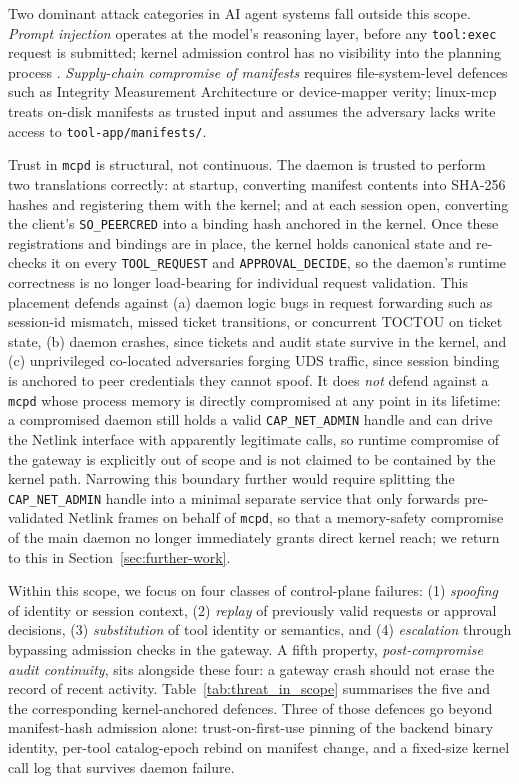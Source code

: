 Two dominant attack categories in AI agent systems fall outside this scope.
\emph{Prompt injection} operates at the model's reasoning layer, before any \texttt{tool:exec} request is submitted; kernel admission control has no visibility into the planning process \cite{greshake2023prompt, liu2023prompt}.
\emph{Supply-chain compromise of manifests} requires file-system-level defences such as Integrity Measurement Architecture or device-mapper verity; linux-mcp treats on-disk manifests as trusted input and assumes the adversary lacks write access to \texttt{tool-app/\allowbreak manifests/}.

Trust in \texttt{mcpd} is structural, not continuous.
The daemon is trusted to perform two translations correctly: at startup, converting manifest contents into SHA-256 hashes and registering them with the kernel; and at each session open, converting the client's \texttt{SO\_\allowbreak PEERCRED} into a binding hash anchored in the kernel.
Once these registrations and bindings are in place, the kernel holds canonical state and re-checks it on every \texttt{TOOL\_\allowbreak REQUEST} and \texttt{APPROVAL\_\allowbreak DECIDE}, so the daemon's runtime correctness is no longer load-bearing for individual request validation.
This placement defends against (a) daemon logic bugs in request forwarding such as session-id mismatch, missed ticket transitions, or concurrent TOCTOU on ticket state, (b) daemon crashes, since tickets and audit state survive in the kernel, and (c) unprivileged co-located adversaries forging UDS traffic, since session binding is anchored to peer credentials they cannot spoof.
It does \emph{not} defend against a \texttt{mcpd} whose process memory is directly compromised at any point in its lifetime: a compromised daemon still holds a valid \texttt{CAP\_\allowbreak NET\_\allowbreak ADMIN} handle and can drive the Netlink interface with apparently legitimate calls, so runtime compromise of the gateway is explicitly out of scope and is not claimed to be contained by the kernel path.
Narrowing this boundary further would require splitting the \texttt{CAP\_\allowbreak NET\_\allowbreak ADMIN} handle into a minimal separate service that only forwards pre-validated Netlink frames on behalf of \texttt{mcpd}, so that a memory-safety compromise of the main daemon no longer immediately grants direct kernel reach; we return to this in Section~\ref{sec:further-work}.

Within this scope, we focus on four classes of control-plane failures:
(1) \emph{spoofing} of identity or session context,
(2) \emph{replay} of previously valid requests or approval decisions,
(3) \emph{substitution} of tool identity or semantics, and
(4) \emph{escalation} through bypassing admission checks in the gateway.
A fifth property, \emph{post-compromise audit continuity}, sits alongside these four: a gateway crash should not erase the record of recent activity.
Table~\ref{tab:threat_in_scope} summarises the five and the corresponding kernel-anchored defences.
Three of those defences go beyond manifest-hash admission alone: trust-on-first-use pinning of the backend binary identity, per-tool catalog-epoch rebind on manifest change, and a fixed-size kernel call log that survives daemon failure.

